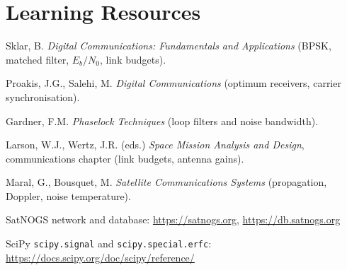 \documentclass[11pt,a4paper]{article}
\begin{document}
\section*{Learning Resources}
\begin{resources}
  \item Sklar, B. \emph{Digital Communications: Fundamentals and Applications} (BPSK, matched filter, $E_b/N_0$, link budgets).
  \item Proakis, J.G., Salehi, M. \emph{Digital Communications} (optimum receivers, carrier synchronisation).
  \item Gardner, F.M. \emph{Phaselock Techniques} (loop filters and noise bandwidth).
\end{resources}
\begin{resources}
  \item Larson, W.J., Wertz, J.R. (eds.) \emph{Space Mission Analysis and Design}, communications chapter (link budgets, antenna gains).
  \item Maral, G., Bousquet, M. \emph{Satellite Communications Systems} (propagation, Doppler, noise temperature).
\end{resources}
\begin{resources}
  \item SatNOGS network and database: \url{https://satnogs.org}, \url{https://db.satnogs.org}
  \item SciPy \texttt{scipy.signal} and \texttt{scipy.special.erfc}: \url{https://docs.scipy.org/doc/scipy/reference/}
\end{resources}

\evaluation
\end{document}
